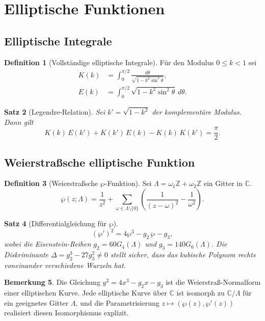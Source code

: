 \documentclass[12pt,a4paper]{amsart}
\newtheorem{theorem}{Satz}[section]
\theoremstyle{definition}
\newtheorem{definition}[theorem]{Definition}
\newtheorem{remark}[theorem]{Bemerkung}
\begin{document}
\section{Elliptische Funktionen}
\label{sec:elliptic}

\subsection{Elliptische Integrale}

\begin{definition}[Vollständige elliptische Integrale]
Für den Modulus \(0 \leq k < 1\) sei
\begin{align*}
  K(k) &= \int_0^{\pi/2}\frac{d\theta}{\sqrt{1-k^2\sin^2\theta}}, \\
  E(k) &= \int_0^{\pi/2}\sqrt{1-k^2\sin^2\theta}\,d\theta.
\end{align*}
\end{definition}

\begin{theorem}[Legendre-Relation]
Sei \(k' = \sqrt{1-k^2}\) der komplementäre Modulus.  Dann gilt
\[
  K(k)\,E(k') + K(k')\,E(k) - K(k)\,K(k') = \frac{\pi}{2}.
\]
\end{theorem}

\subsection{Weierstraßsche elliptische Funktion}

\begin{definition}[Weierstraßsche \(\wp\)-Funktion]
Sei \(\Lambda = \omega_1\mathbb{Z} + \omega_2\mathbb{Z}\) ein Gitter in \(\mathbb{C}\).
\[
  \wp(z; \Lambda) = \frac{1}{z^2}
  + \sum_{\omega \in \Lambda\setminus\{0\}} \left(\frac{1}{(z-\omega)^2} - \frac{1}{\omega^2}\right).
\]
\end{definition}

\begin{theorem}[Differentialgleichung für \(\wp\)]
\[
  (\wp')^2 = 4\wp^3 - g_2\,\wp - g_3,
\]
wobei die Eisenstein-Reihen \(g_2 = 60 G_4(\Lambda)\) und \(g_3 = 140 G_6(\Lambda)\).
Die Diskriminante \(\Delta = g_2^3 - 27g_3^2 \neq 0\) stellt sicher, dass das kubische
Polynom rechts voneinander verschiedene Wurzeln hat.
\end{theorem}

\begin{remark}
Die Gleichung \(y^2 = 4x^3 - g_2 x - g_3\) ist die Weierstraß-Normalform einer
elliptischen Kurve.  Jede elliptische Kurve über \(\mathbb{C}\) ist isomorph zu
\(\mathbb{C}/\Lambda\) für ein geeignetes Gitter \(\Lambda\), und die Parametrisierung
\(z \mapsto (\wp(z), \wp'(z))\) realisiert diesen Isomorphismus explizit.
\end{remark}
\end{document}
